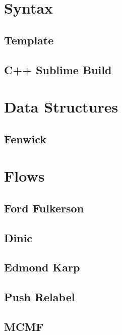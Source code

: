 \section{Syntax}
\subsection{Template}
\raggedbottom
\subsection{C++ Sublime Build}
\raggedbottom

\section{Data Structures}
\subsection{Fenwick}
\raggedbottom

\section{Flows}
\subsection{Ford Fulkerson}
\raggedbottom
\subsection{Dinic}
\raggedbottom
\subsection{Edmond Karp}
\raggedbottom
\subsection{Push Relabel}
\raggedbottom
\subsection{MCMF}
\raggedbottom

